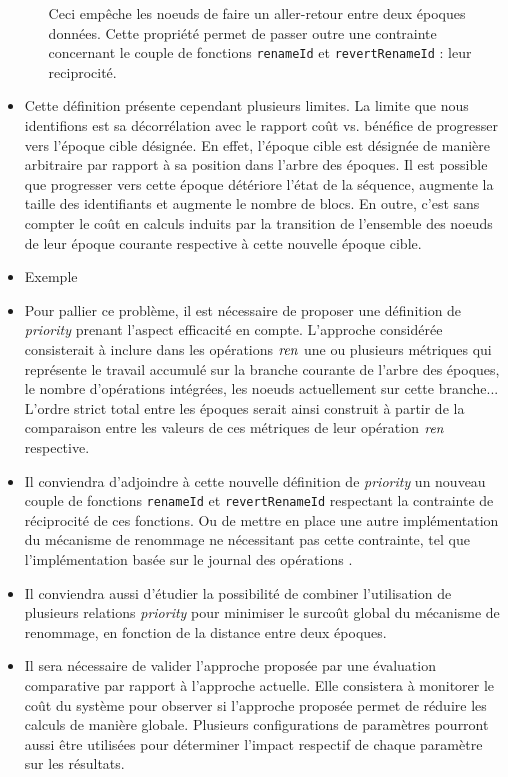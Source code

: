 \begin{itemize}
\begin{enumerate}
                Ceci empêche les noeuds de faire un aller-retour entre deux époques données.
                Cette propriété permet de passer outre une contrainte concernant le couple de fonctions \texttt{renameId} et \texttt{revertRenameId} : leur reciprocité.
        \end{enumerate}
    \item Cette définition présente cependant plusieurs limites.
        La limite que nous identifions est sa décorrélation avec le rapport coût vs. bénéfice de progresser vers l'époque cible désignée.
        En effet, l'époque cible est désignée de manière arbitraire par rapport à sa position dans l'arbre des époques.
        Il est possible que progresser vers cette époque détériore l'état de la séquence, \ie augmente la taille des identifiants et augmente le nombre de blocs.
        En outre, c'est sans compter le coût en calculs induits par la transition de l'ensemble des noeuds de leur époque courante respective à cette nouvelle époque cible.
    \item Exemple
    \item Pour pallier ce problème, il est nécessaire de proposer une définition de \emph{priority} prenant l'aspect efficacité en compte.
        L'approche considérée consisterait à inclure dans les opérations $\mathit{ren}$ une ou plusieurs métriques qui représente le travail accumulé sur la branche courante de l'arbre des époques, \eg le nombre d'opérations intégrées, les noeuds actuellement sur cette branche...
        L'ordre strict total entre les époques serait ainsi construit à partir de la comparaison entre les valeurs de ces métriques de leur opération $\mathit{ren}$ respective.
    \item Il conviendra d'adjoindre à cette nouvelle définition de \emph{priority} un nouveau couple de fonctions \texttt{renameId} et \texttt{revertRenameId} respectant la contrainte de réciprocité de ces fonctions.
        Ou de mettre en place une autre implémentation du mécanisme de renommage ne nécessitant pas cette contrainte, tel que l'implémentation basée sur le journal des opérations .
    \item Il conviendra aussi d'étudier la possibilité de combiner l'utilisation de plusieurs relations \emph{priority} pour minimiser le surcoût global du mécanisme de renommage, \eg en fonction de la distance entre deux époques.
    \item Il sera nécessaire de valider l'approche proposée par une évaluation comparative par rapport à l'approche actuelle.
        Elle consistera à monitorer le coût du système pour observer si l'approche proposée permet de réduire les calculs de manière globale.
        Plusieurs configurations de paramètres pourront aussi être utilisées pour déterminer l'impact respectif de chaque paramètre sur les résultats.
\end{itemize}
